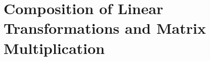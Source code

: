 \vspace{12pt}

\setcounter{Exercise}{7}


\vspace{12pt}

\setcounter{Exercise}{11}


\vspace{12pt}

\setcounter{Exercise}{15}



\section{Composition of Linear Transformations and Matrix
Multiplication}



\vspace{12pt}



\vspace{12pt}

\setcounter{Exercise}{11}


\vspace{12pt}

